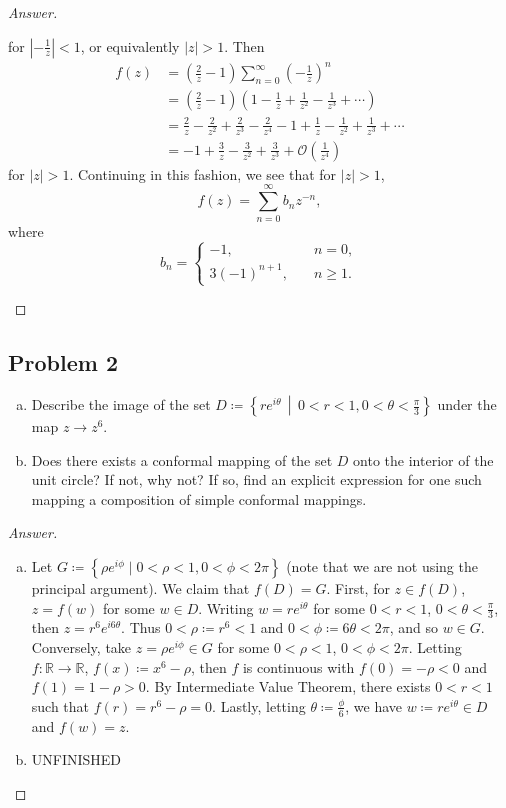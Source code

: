 \documentclass[12pt]{article}
\newcommand{\real}{\mathbb{R}}
\newcommand\paren[1]{\left( #1 \right)}
\newcommand\setb[1]{\left \{ #1 \right \}}
\theoremstyle{definition}
\begin{document}
\begin{proof}[Answer]
\begin{enumerate}[(a)]
        for $\left| -\frac{1}{z} \right| < 1$, or equivalently $|z|  > 1$. Then 
        \begin{align*}
            f(z) & = \paren{ \frac{2}{z} - 1 } \sum\limits_{n = 0}^{\infty} \paren{ -\frac{1}{z} }^n \\
            & = \paren{ \frac{2}{z} - 1 } \paren{ 1 - \frac{1}{z} + \frac{1}{z^2} - \frac{1}{z^3} + \dotsb } \\
            & = \frac{2}{z} - \frac{2}{z^2} + \frac{2}{z^3} - \frac{2}{z^4} - 1 + \frac{1}{z} - \frac{1}{z^2} + \frac{1}{z^3} + \dotsb \\
            & = -1 + \frac{3}{z} - \frac{3}{z^2} + \frac{3}{z^3} + \mathcal{O} \paren{ \frac{1}{z^4} }
        \end{align*}
        for $|z| > 1$. Continuing in this fashion, we see that for $|z| > 1$,
        \[
            f(z) = \sum\limits_{n = 0}^{\infty} b_n z^{-n},
        \]
        where 
        \[
            b_n = 
            \begin{cases}
                -1 , & \quad n = 0 , \\
                3(-1)^{n+1} , & \quad n \geq 1.
            \end{cases}
        \]
    \end{enumerate}
\end{proof}
\subsection{Problem 2}
\begin{enumerate}[(a)]
    \item Describe the image of the set $D \coloneqq \setb{ re^{i \theta} \, \middle| \, 0 < r < 1 , 0 < \theta < \frac{\pi}{3} }$ under the map $z \to z^6$.
    \item Does there exists a conformal mapping of the set $D$ onto the interior of the unit circle? If not, why not? If so, find an explicit expression for one such mapping a composition of simple conformal mappings.
\end{enumerate}
\begin{proof}[Answer]
    \noindent
    \begin{enumerate}[(a)]
        \item Let $G \coloneqq \setb{ \rho e^{i \phi} \mid 0 < \rho < 1 , 0 < \phi < 2\pi }$ (note that we are not using the principal argument). We claim that $f(D) = G$. First, for $z \in f(D)$, $z = f(w)$ for some $w \in D$. Writing $w = re^{i \theta}$ for some $0 < r < 1$, $0 < \theta < \frac{\pi}{3}$, then $z = r^6 e^{i 6\theta}$. Thus $0 < \rho \coloneqq r^6 < 1$ and $0 < \phi \coloneqq 6 \theta < 2 \pi$, and so $w \in G$. Conversely, take $z = \rho e^{i \phi} \in G$ for some $0 < \rho < 1$, $0 < \phi < 2\pi$. Letting $f : \real \to \real$, $f(x) \coloneqq x^6 - \rho$, then $f$ is continuous with $f(0) = -\rho < 0$ and $f(1) = 1 - \rho > 0$. By Intermediate Value Theorem, there exists $0 < r < 1$ such that $f(r) = r^6 - \rho = 0$. Lastly, letting $\theta \coloneqq \frac{\phi}{6}$, we have $w \coloneqq re^{i \theta} \in D$ and $f(w) = z$. 
        \item UNFINISHED
    \end{enumerate}
\end{proof}
\end{document}
